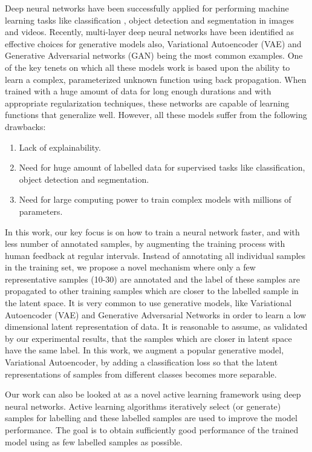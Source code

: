 \documentclass{bmvc2k}
\begin{document}
Deep neural networks have been successfully applied  for performing machine learning tasks like classification \cite{alexnet,vggnet,resnet}, object detection \cite{faster_rcnn,yolo} and segmentation \cite{deeplab,unet} in images and videos.
Recently, multi-layer deep neural networks have been identified as  effective  choices for  generative models also, Variational Autoencoder (VAE) \cite{vae} and Generative Adversarial networks (GAN) \cite{gan} being the most common examples.
One of the key tenets on which all these models work is  based upon the ability to learn a complex, parameterized unknown function using back propagation.
When trained with a huge amount of data for long enough durations and with appropriate regularization techniques, these networks are capable of learning functions that generalize well.
However, all these  models suffer from the following drawbacks:
\begin{enumerate}
  \item Lack of explainability.
  \item Need for huge amount of labelled data for supervised tasks like classification, object detection and segmentation.
  \item Need for large computing power to train complex models with millions of parameters.
\end{enumerate}

In this work, our key focus is on how to train a neural network faster, and with less number of annotated samples, by augmenting the training process with human feedback at regular intervals.
Instead of annotating all individual samples in the training set, we propose a novel mechanism where only a few representative samples (10-30) are annotated and the label of these samples are propagated to other training samples  which are closer to the labelled sample in the latent space.
It is very common to use  generative models, like Variational Autoencoder (VAE) \cite{vae} and Generative Adversarial Networks \cite{gan} in order to learn a low dimensional latent representation of data.
It is reasonable to assume, as validated by our experimental results, that the samples which are closer in latent space have the same label.
In this work, we augment a popular generative model, Variational Autoencoder,  by adding a classification loss so that the latent representations of samples from different classes becomes more separable.

Our work can also be looked at  as a novel  active learning framework using deep neural networks.
Active learning algorithms iteratively select (or generate) samples for labelling and these labelled samples are used to improve the model performance.
The goal is to obtain sufficiently good performance of the trained model using as few labelled samples as possible.
\end{document}
